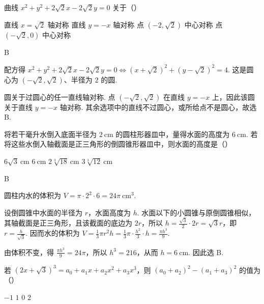 \begin{problem}
曲线 \(x^{2} + y^{2} + 2\sqrt{2} x - 2\sqrt{2} y = 0\) 关于（\quad）

\choices
    {直线 \(x = \sqrt{2}\) 轴对称}
    {直线 \(y = -x \) 轴对称}
    {点 \((-2, \sqrt{2})\) 中心对称}
    {点 \((- \sqrt{2}, 0)\) 中心对称}
\end{problem}

\begin{answer}
B
\end{answer}

\begin{solution}
配方得
\(x^2+y^2+2\sqrt2x-2\sqrt2y=0\Longleftrightarrow (x+\sqrt2)^2+(y-\sqrt2)^2=4\).
这是圆心为 \((-\sqrt2,\sqrt2)\)、半径为 \(2\) 的圆.

圆关于过圆心的任一直线轴对称. 点 \((-\sqrt2,\sqrt2)\) 在直线 \(y=-x\) 上，因此该圆关于直线 \(y=-x\) 轴对称. 其余选项中的直线不过圆心，或所给点不是圆心，故选 B.
\end{solution}

\begin{problem}
将若干毫升水倒入底面半径为 \(2\mathrm{~cm}\) 的圆柱形器皿中，量得水面的高度为 \(6\mathrm{~cm}\). 若将这些水倒入轴截面是正三角形的倒圆锥形器皿中，则水面的高度是（\quad）

\choices
    {\(6\sqrt{3}\mathrm{~cm}\)}
    {\(6\mathrm{~cm}\)}
    {\(2\sqrt[3]{18}\mathrm{~cm}\)}
    {\(3\sqrt[3]{12}\mathrm{~cm}\)}
\end{problem}

\begin{answer}
B
\end{answer}

\begin{solution}
圆柱内水的体积为
\(V=\pi\cdot2^2\cdot6=24\pi\ \mathrm{cm}^3\).

设倒圆锥中水面的半径为 \(r\)，水面高度为 \(h\). 水面以下的小圆锥与原倒圆锥相似，其轴截面是正三角形，且该截面的底边为 \(2r\)，所以 \(h=\frac{\sqrt3}{2}\cdot2r=\sqrt3r\)，即 \(r=\frac{h}{\sqrt3}\). 因而水的体积为
\(V=\frac13\pi r^2h=\frac13\pi\cdot\frac{h^2}{3}\cdot h=\frac{\pi h^3}{9}\).

由体积不变，得 \(\frac{\pi h^3}{9}=24\pi\)，所以 \(h^3=216\)，从而 \(h=6\ \mathrm{cm}\). 因此选 B.
\end{solution}

\begin{problem}
若 \((2x + \sqrt{3})^3 = a_0 + a_1x + a_2x^2 + a_3x^3\)，则 \((a_0 + a_2)^2 - (a_1 + a_3)^2\) 的值为（\quad）

\choices
    {\(-1\)}
    {\(1\)}
    {\(0\)}
    {\(2\)}
\end{problem}

